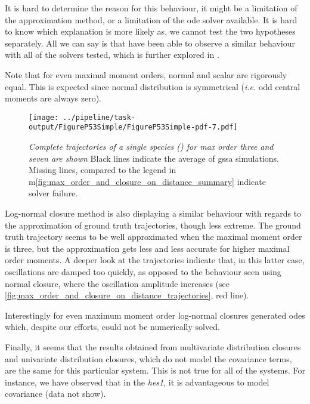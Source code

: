 It is hard to determine the reason for this behaviour, it might be a limitation of the approximation method, or a limitation of the \gls{ode} solver available. It is hard to know which explanation is more likely as, we cannot test the two hypotheses separately. All we can say is that have been able to observe a similar behaviour with all of the solvers tested, which is further explored in .

Note that for even maximal moment orders, normal and scalar are rigorously equal.
This is expected since normal distribution is symmetrical (\emph{i.e.} odd central moments are always zero).

\begin{figure}
    \centering
    \texttt{[image: ../pipeline/task-output/FigureP53Simple/FigureP53Simple-pdf-7.pdf]}
    \caption{\emph{Complete trajectories of a single species (\pft) for max order three and seven are shown} Black lines indicate the average of \gls{gssa} simulations. Missing lines, compared to the legend in  m\autoref{fig:max_order_and_closure_on_distance_summary} indicate solver failure.}
    \label{fig:max_order_and_closure_on_distance_trajectories}
\end{figure}

Log-normal closure method is also displaying a similar behaviour with regards to the approximation of ground truth trajectories, though less extreme. 
The ground truth trajectory seems to be well approximated when the maximal moment order is three, but the approximation gets less and less accurate for higher maximal order moments.
A deeper look at the trajectories indicate that, in this latter case,
oscillations are damped too quickly, as opposed to the behaviour seen using normal closure, where the oscillation amplitude increases (see \autoref{fig:max_order_and_closure_on_distance_trajectories}, red line).

 Interestingly for even maximum moment order log-normal closures generated \gls{ode}s which,
despite our efforts, could not be numerically solved.

Finally, it seems that the results obtained from multivariate distribution closures and  univariate distribution closures, which do not model the covariance terms, are the same for this particular system. 
This is not true for all of the systems. For instance, we have observed that in the \emph{hes1}, it is advantageous to model covariance (data not show).

